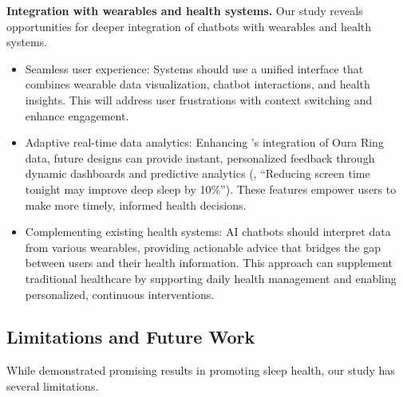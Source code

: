 \par{}\textbf{Integration with wearables and health systems.}
Our study reveals opportunities for deeper integration of chatbots with wearables and health systems. 
\begin{itemize}
\item Seamless user experience: Systems should use a unified interface that combines wearable data visualization, chatbot interactions, and health insights. This will address user frustrations with context switching and enhance engagement.
\item Adaptive real-time data analytics: 
Enhancing \name{}'s integration of Oura Ring data, future designs can provide instant, personalized feedback through dynamic dashboards and predictive analytics (\eg, ``Reducing screen time tonight may improve deep sleep by 10\%''). 
These features empower users to make more timely, informed health decisions.
\item Complementing existing health systems: AI chatbots should interpret data from various wearables, providing actionable advice that bridges the gap between users and their health information. This approach can supplement traditional healthcare by supporting daily health management and enabling personalized, continuous interventions.
\end{itemize}


\subsection{Limitations and Future Work}
While \name{} demonstrated promising results in promoting sleep health, our study has several limitations.

